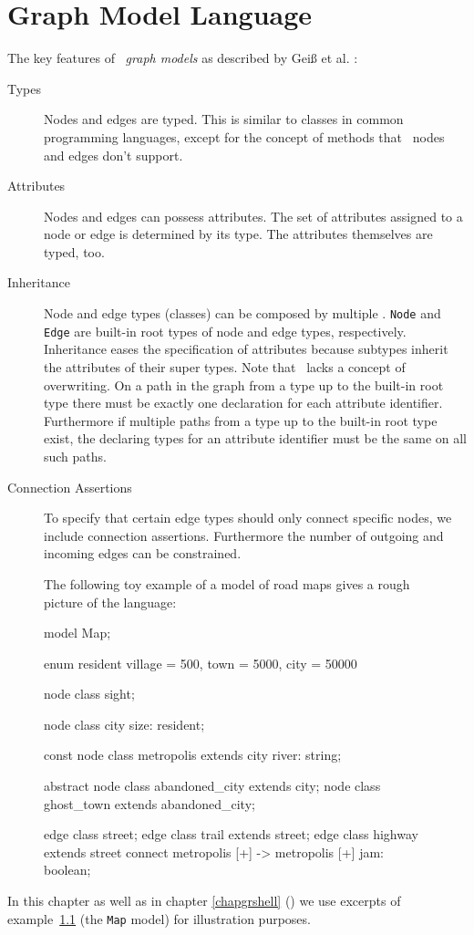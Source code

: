 \chapter{Graph Model Language}
\label{chapmodellang}
The key features of \GrG\ \emph{graph models} as described by Geiß et al. \cite{GBGHS:06,KG:07}:

\begin{description}
\item[Types] Nodes and edges are typed. 
  This is similar to classes in common programming languages, except for the concept of methods that \GrG\ nodes and edges don't support. 
\item[Attributes] Nodes and edges can possess attributes. The set of attributes assigned to a node or edge is determined by its type. The attributes themselves are typed, too.
\item[Inheritance] Node and edge types (classes) can be composed by multiple . \texttt{Node} and \texttt{Edge} are built-in root types of node and edge types, respectively. Inheritance eases the specification of attributes because subtypes inherit the attributes of their super types. Note that \GrG\ lacks a concept of overwriting. On a path in the  graph from a type up to the built-in root type there must be exactly one declaration for each attribute identifier. Furthermore if multiple paths from a type up to the built-in root type exist, the declaring types for an attribute identifier must be the same on all such paths.
\item[Connection Assertions] To specify that certain edge types should only connect specific nodes, we include connection assertions. Furthermore the number of outgoing and incoming edges can be constrained.
\end{description}

\begin{figure}[htbf]
\begin{example}\label{ex:model:map}
The following toy example of a model of road maps gives a rough picture of the language:
\begin{grgen}
model Map;

enum resident {village = 500, town = 5000, city = 50000}

node class sight;

node class city {
	size: resident;
}

const node class metropolis extends city {
  river: string;
}  

abstract node class abandoned_city extends city;
node class ghost_town extends abandoned_city;

edge class street;
edge class trail extends street;
edge class highway extends street
    connect metropolis [+] -> metropolis [+]
{
    jam: boolean;
}
\end{grgen}
\end{example}
\end{figure}
In this chapter as well as in chapter \ref{chapgrshell} (\GrShell) we use excerpts of example~\ref{ex:model:map} (the \texttt{Map} model) for illustration purposes.

